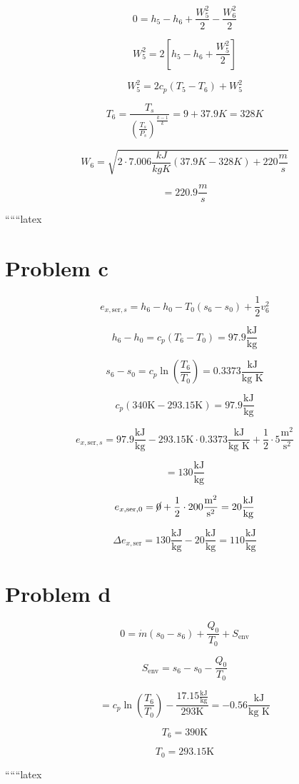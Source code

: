 \[
0 = h_5 - h_6 + \frac{W_5^2}{2} - \frac{W_6^2}{2}
\]

\[
W_5^2 = 2 \left[ h_5 - h_6 + \frac{W_5^2}{2} \right]
\]

\[
W_5^2 = 2 c_p \left( T_5 - T_6 \right) + W_5^2
\]

\[
T_6 = \frac{T_s}{\left( \frac{T_s}{P_s} \right)^{\frac{k-1}{k}}} = 9 + 37.9K = 328K
\]

\[
W_6 = \sqrt{2 \cdot 7.006 \frac{kJ}{kgK} \left( 37.9K - 328K \right) + 220 \frac{m}{s}}
\]

\[
= 220.9 \frac{m}{s}
\]

``````latex


\section*{Problem c}

\[
e_{x, \text{ser}, s} = h_6 - h_0 - T_0 (s_6 - s_0) + \frac{1}{2} v_6^2
\]

\[
h_6 - h_0 = c_p (T_6 - T_0) = 97.9 \frac{\text{kJ}}{\text{kg}}
\]

\[
s_6 - s_0 = c_p \ln \left( \frac{T_6}{T_0} \right) = 0.3373 \frac{\text{kJ}}{\text{kg K}}
\]

\[
c_p (340 \text{K} - 293.15 \text{K}) = 97.9 \frac{\text{kJ}}{\text{kg}}
\]

\[
e_{x, \text{ser}, s} = 97.9 \frac{\text{kJ}}{\text{kg}} - 293.15 \text{K} \cdot 0.3373 \frac{\text{kJ}}{\text{kg K}} + \frac{1}{2} \cdot 5 \frac{\text{m}^2}{\text{s}^2}
\]

\[
= 130 \frac{\text{kJ}}{\text{kg}}
\]

\[
e_{x, \text{ser}, 0} = \cancel{0} + \frac{1}{2} \cdot 200 \frac{\text{m}^2}{\text{s}^2} = 20 \frac{\text{kJ}}{\text{kg}}
\]

\[
\Delta e_{x, \text{ser}} = 130 \frac{\text{kJ}}{\text{kg}} - 20 \frac{\text{kJ}}{\text{kg}} = 110 \frac{\text{kJ}}{\text{kg}}
\]

\section*{Problem d}

\[
0 = \dot{m} (s_0 - s_6) + \frac{Q_0}{T_0} + S_{\text{env}}
\]

\[
S_{\text{env}} = s_6 - s_0 - \frac{Q_0}{T_0}
\]

\[
= c_p \ln \left( \frac{T_6}{T_0} \right) - \frac{17.15 \frac{\text{kJ}}{\text{kg}}}{293 \text{K}} = -0.56 \frac{\text{kJ}}{\text{kg K}}
\]

\[
T_6 = 390 \text{K}
\]

\[
T_0 = 293.15 \text{K}
\]

``````latex


